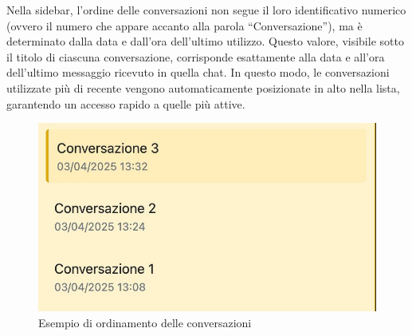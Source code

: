 Nella sidebar, l’ordine delle conversazioni non segue il loro identificativo numerico (ovvero il numero che appare accanto alla parola “Conversazione”), ma è determinato dalla data e dall’ora dell’ultimo utilizzo. Questo valore, visibile sotto il titolo di ciascuna conversazione, corrisponde esattamente alla data e all’ora dell’ultimo messaggio ricevuto in quella chat. In questo modo, le conversazioni utilizzate più di recente vengono automaticamente posizionate in alto nella lista, garantendo un accesso rapido a quelle più attive.
\begin{figure}[H]
\centering
\includegraphics[width=1\textwidth]{contents/img/order_conv.jpg}
\caption{Esempio di ordinamento delle conversazioni}
\end{figure}

